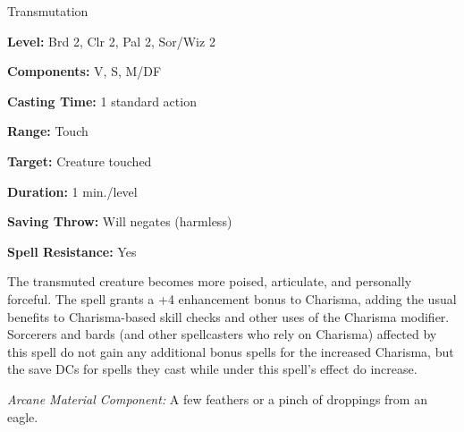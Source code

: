 
Transmutation

\textbf{Level:} Brd 2, Clr 2, Pal 2, Sor/Wiz 2

\textbf{Components:} V, S, M/DF

\textbf{Casting Time:} 1 standard action

\textbf{Range:} Touch

\textbf{Target:} Creature touched

\textbf{Duration:} 1 min./level

\textbf{Saving Throw:} Will negates (harmless)

\textbf{Spell Resistance:} Yes

The transmuted creature becomes more poised, articulate, and personally forceful. 
The spell grants a +4 enhancement bonus to Charisma, adding the usual benefits 
to Charisma-based skill checks and other uses of the Charisma modifier. Sorcerers 
and bards (and other spellcasters who rely on Charisma) affected by this spell 
do not gain any additional bonus spells for the increased Charisma, but the save 
DCs for spells they cast while under this spell's effect do increase.

\textit{Arcane Material Component:} A few feathers or a pinch of droppings from 
an eagle.


